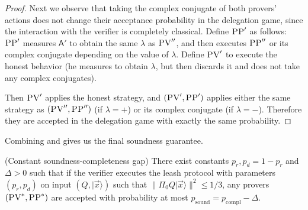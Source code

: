 \documentclass{toc}
\newcommand{\ket}[1]{|#1\rangle}
\DeclareMathOperator{\sound}{sound}
\DeclareMathOperator{\compl}{compl}
\newcommand{\reg}[1]{{\textsf{#1}}}
\newcommand{\pv}{\textsc{PV}}
\newcommand{\pp}{\textsc{PP}}
\begin{document}
\begin{proof}
Next we observe that taking the complex conjugate of both provers' actions does not change their acceptance probability in the delegation game, since the interaction with the verifier is completely classical. Define $\pp'$ as follows: $\pp'$ measures $\reg{A}'$ to obtain the same $\lambda$ as $\pv''$, and then executes $\pp''$ or its complex conjugate depending on the value of $\lambda$. Define $\pv'$ to execute the honest behavior (he measures to obtain $\lambda$, but then discards it and does not take any complex conjugates). 

Then $\pv'$ applies the honest strategy, and $(\pv',\pp')$ applies either the same strategy as $(\pv'',\pp'')$ (if $\lambda=+$) or its complex conjugate (if $\lambda=-$). Therefore they are accepted in the delegation game with exactly the same probability. 
\end{proof}

\noindent Combining  and  gives us the final soundness guarantee.

\begin{lemma}\label{lem:leash-soundness} (Constant soundness-completeness gap)
There exist constants $p_r,p_d=1-p_r$ and $\Delta>0$ such that if the verifier executes the leash protocol with parameters $(p_r,p_d)$ on input $(Q,\ket{\vec{x}})$ such that $\|\Pi_0 Q\ket{\vec{x}}\|^2 \leq 1/3$, any provers $(\pv^*,\pp^*)$ are accepted with probability at most \mbox{$p_{\sound}=p_{\compl}-\Delta$}.  
\end{lemma}
\end{document}
